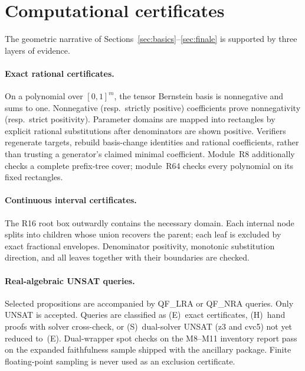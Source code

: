 \documentclass[11pt,reqno]{amsart}
\theoremstyle{definition}
\begin{document}
\section{Computational certificates}\label{sec:certs}

The geometric narrative of Sections~\ref{sec:basics}--\ref{sec:finale} is
supported by three layers of evidence.



\paragraph{Exact rational certificates.}
On a polynomial over $[0,1]^m$, the tensor Bernstein basis is nonnegative and
sums to one.  Nonnegative (resp.\ strictly positive) coefficients prove
nonnegativity (resp.\ strict positivity).  Parameter domains are mapped into
rectangles by explicit rational substitutions after denominators are shown
positive.  Verifiers regenerate targets, rebuild basis-change identities and
rational coefficients, rather than trusting a generator's claimed minimal
coefficient.  Module~R8 additionally checks a complete prefix-tree cover;
module~R64 checks every polynomial on its fixed rectangles.

\paragraph{Continuous interval certificates.}
The R16 root box outwardly contains the necessary domain.  Each internal node
splits into children whose union recovers the parent; each leaf is excluded by
exact fractional envelopes.  Denominator positivity, monotonic substitution
direction, and all leaves together with their boundaries are checked.

\paragraph{Real-algebraic UNSAT queries.}
Selected propositions are accompanied by QF\_LRA or QF\_NRA queries.  Only
UNSAT is accepted.  Queries are classified as (E)~exact certificates,
(H)~hand proofs with solver cross-check, or (S)~dual-solver UNSAT (z3 and
cvc5) not yet reduced to~(E).  Dual-wrapper spot checks on the M8--M11
inventory report pass on the expanded faithfulness sample shipped with the
ancillary package.  Finite floating-point sampling is never used as an
exclusion certificate.
\end{document}
